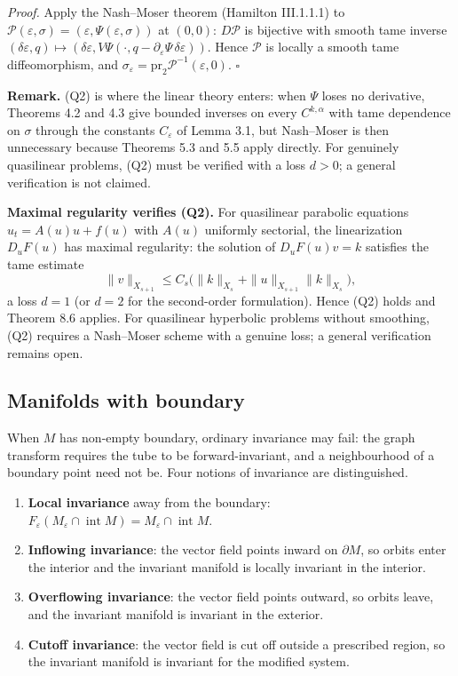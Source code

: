 \documentclass[11pt,a4paper]{article}
\theoremstyle{plain}
\theoremstyle{definition}
\theoremstyle{remark}
\numberwithin{equation}{section}
\numberwithin{figure}{section}
\begin{document}
\textit{Proof.} Apply the Nash–Moser theorem (Hamilton III.1.1.1) to $\mathcal P(\varepsilon,\sigma)=(\varepsilon,\Psi(\varepsilon,\sigma))$ at $(0,0)$: $D\mathcal P$ is bijective with smooth tame inverse $(\delta\varepsilon,q)\mapsto(\delta\varepsilon,V\Psi(\cdot,q-\partial_\varepsilon\Psi\,\delta\varepsilon))$. Hence $\mathcal P$ is locally a smooth tame diffeomorphism, and $\sigma_\varepsilon=\mathrm{pr}_2\mathcal P^{-1}(\varepsilon,0)$. $\square$

\textbf{Remark.} (Q2) is where the linear theory enters: when $\Psi$ loses no derivative, Theorems 4.2 and 4.3 give bounded inverses on every $C^{k,\alpha}$ with tame dependence on $\sigma$ through the constants $C_{\varepsilon}$ of Lemma 3.1, but Nash–Moser is then unnecessary because Theorems 5.3 and 5.5 apply directly. For genuinely quasilinear problems, (Q2) must be verified with a loss $d>0$; a general verification is not claimed.

\textbf{Maximal regularity verifies (Q2).} For quasilinear parabolic equations \(u_t=A(u)u+f(u)\) with \(A(u)\) uniformly sectorial, the linearization \(D_uF(u)\) has maximal regularity: the solution of $D_uF(u)v=k$ satisfies the tame estimate
\[
\|v\|_{X_{s+1}}\le C_s\big(\|k\|_{X_s}+\|u\|_{X_{s+1}}\|k\|_{X_s}\bigr),
\]
a loss $d=1$ (or $d=2$ for the second-order formulation). Hence (Q2) holds and Theorem 8.6 applies. For quasilinear hyperbolic problems without smoothing, (Q2) requires a Nash–Moser scheme with a genuine loss; a general verification remains open.

\subsection{Manifolds with boundary}

When \(M\) has non-empty boundary, ordinary invariance may fail: the graph transform requires the tube to be forward-invariant, and a neighbourhood of a boundary point need not be. Four notions of invariance are distinguished.

\begin{enumerate}
    \item \textbf{Local invariance} away from the boundary: \(F_\varepsilon(M_\varepsilon\cap\operatorname{int}M)=M_\varepsilon\cap\operatorname{int}M\).
    \item \textbf{Inflowing invariance}: the vector field points inward on \(\partial M\), so orbits enter the interior and the invariant manifold is locally invariant in the interior.
    \item \textbf{Overflowing invariance}: the vector field points outward, so orbits leave, and the invariant manifold is invariant in the exterior.
    \item \textbf{Cutoff invariance}: the vector field is cut off outside a prescribed region, so the invariant manifold is invariant for the modified system.
\end{enumerate}
\end{document}
